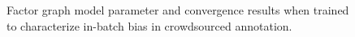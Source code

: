 \begin{figure}[!t]
  \centering
  \caption{\label{fig:modelanalysis}Factor graph model parameter and convergence
    results when trained to characterize in-batch bias in crowdsourced annotation.
  }
\end{figure}